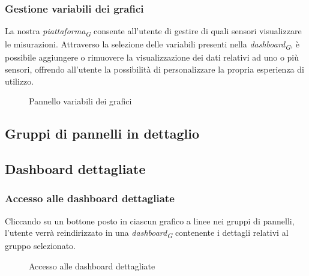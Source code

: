 \subsubsection{Gestione variabili dei grafici}
\hypertarget{par:gestione_variabili_panel}{}
La nostra \textit{piattaforma}\textsubscript{\textit{G}} consente all'utente di gestire di quali sensori visualizzare le misurazioni. Attraverso la selezione delle variabili presenti nella \textit{dashboard}\textsubscript{\textit{G}}, è possibile aggiungere o rimuovere la visualizzazione dei dati relativi ad uno o più sensori, offrendo all'utente la possibilità di personalizzare la propria esperienza di utilizzo. 
\begin{figure}[H]
    \centering
    \caption{Pannello variabili dei grafici}
    \label{fig:my_label}
\end{figure}


\subsection{Gruppi di pannelli in dettaglio}




\subsection{Dashboard dettagliate}
\subsubsection{Accesso alle dashboard dettagliate}
Cliccando su un bottone posto in ciascun grafico a linee nei gruppi di pannelli, l'utente verrà reindirizzato in una \textit{dashboard}\textsubscript{\textit{G}} contenente i dettagli relativi al gruppo selezionato. 
\begin{figure}[H]
    \centering
    \caption{Accesso alle dashboard dettagliate}
    \label{fig:my_label}
\end{figure}

